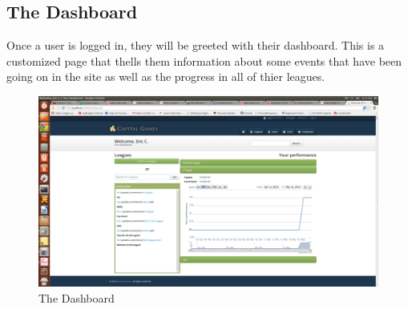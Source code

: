 \subsection{The Dashboard}
Once a user is logged in, they will be greeted with their dashboard. This is a customized page that thells them information about some events that have been going on in the site as well as the progress in all of thier leagues.
\begin{figure}[H]
\centering
\includegraphics[width=5.5in]{./img/finalDesign/dashboard.png}
\caption{The Dashboard}
\end{figure}
